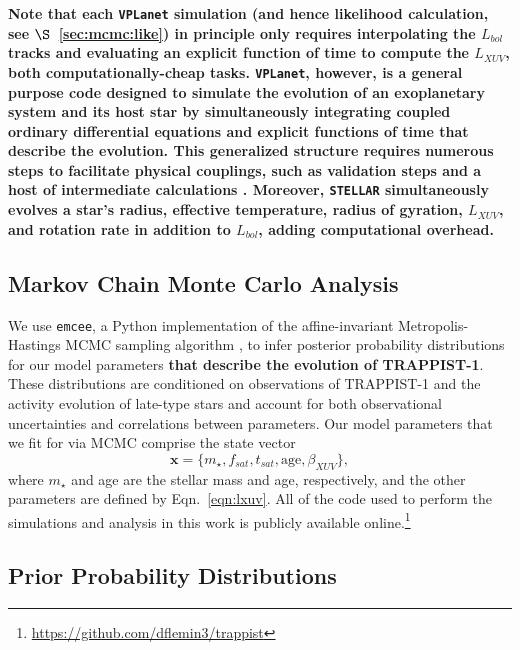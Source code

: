 \documentclass[twocolumn]{aastex62}
\newcommand{\xxx}[1]{{\textbf{#1}}}
\newcommand{\vplanet}[0]{\texttt{VPLanet}\xspace}
\newcommand{\stellar}[0]{\texttt{STELLAR}\xspace}
\begin{document}
\xxx{Note that each \vplanet simulation (and hence likelihood calculation, see $\S$~\ref{sec:mcmc:like}) in principle only requires interpolating the \citet{Baraffe2015} $L_{bol}$ tracks and evaluating an explicit function of time to compute the $L_{XUV}$, both computationally-cheap tasks. \vplanet, however, is a general purpose code designed to simulate the evolution of an exoplanetary system and its host star by simultaneously integrating coupled ordinary differential equations and explicit functions of time that describe the evolution. This generalized structure requires numerous steps to facilitate physical couplings, such as validation steps and a host of intermediate calculations \citep[for more details, see][]{Barnes2019}. Moreover, \stellar simultaneously evolves a star's radius, effective temperature, radius of gyration, $L_{XUV}$, and rotation rate in addition to $L_{bol}$, adding computational overhead.}

\subsection{Markov Chain Monte Carlo Analysis} \label{sec:mcmc}

We use \texttt{emcee}, a Python implementation of the affine-invariant Metropolis-Hastings MCMC sampling algorithm \citep{ForemanMackey2013}, to infer posterior probability distributions for our model parameters \xxx{that describe the evolution of TRAPPIST-1}. These distributions are conditioned on observations of TRAPPIST-1 and the activity evolution of late-type stars and account for both observational uncertainties and correlations between parameters. Our model parameters that we fit for via MCMC comprise the state vector
\begin{equation} \label{eqn:state}
    \textbf{x} = \{m_{\star}, f_{sat}, t_{sat}, \mathrm{age}, \beta_{XUV}\},
\end{equation}
where $m_{\star}$ and age are the stellar mass and age, respectively, and the other parameters are defined by Eqn.~\ref{eqn:lxuv}. All of the code used to perform the simulations and analysis in this work is publicly available online.\footnote{ \href{https://github.com/dflemin3/trappist}{https://github.com/dflemin3/trappist}}

\subsection{Prior Probability Distributions} \label{sec:mcmc:priors}
\end{document}
